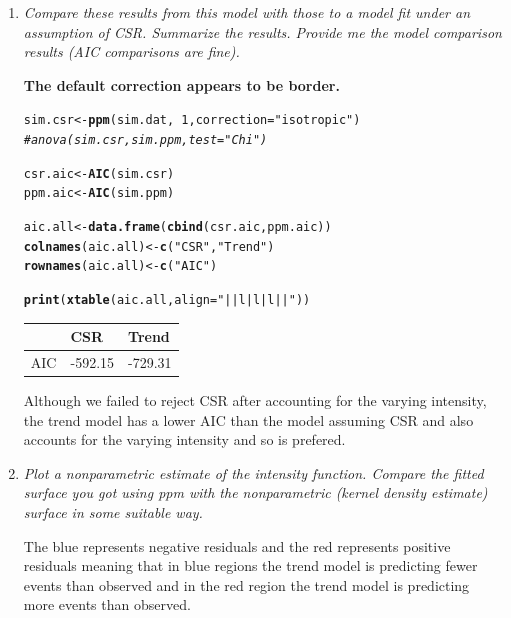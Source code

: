 \documentclass{article}\usepackage[]{graphicx}\usepackage[]{color}
\makeatletter
\newcommand{\hlnum}[1]{\textcolor[rgb]{0.686,0.059,0.569}{#1}}%
\newcommand{\hlstr}[1]{\textcolor[rgb]{0.192,0.494,0.8}{#1}}%
\newcommand{\hlcom}[1]{\textcolor[rgb]{0.678,0.584,0.686}{\textit{#1}}}%
\newcommand{\hlopt}[1]{\textcolor[rgb]{0,0,0}{#1}}%
\newcommand{\hlstd}[1]{\textcolor[rgb]{0.345,0.345,0.345}{#1}}%
\newcommand{\hlkwb}[1]{\textcolor[rgb]{0.69,0.353,0.396}{#1}}%
\newcommand{\hlkwc}[1]{\textcolor[rgb]{0.333,0.667,0.333}{#1}}%
\newcommand{\hlkwd}[1]{\textcolor[rgb]{0.737,0.353,0.396}{\textbf{#1}}}%
\newenvironment{kframe}{%
 \def\at@end@of@kframe{}%
 \ifinner\ifhmode%
  \def\at@end@of@kframe{\end{minipage}}%
  \begin{minipage}{\columnwidth}%
 \fi\fi%
 \def\FrameCommand##1{\hskip\@totalleftmargin \hskip-\fboxsep
 \colorbox{shadecolor}{##1}\hskip-\fboxsep
     \hskip-\linewidth \hskip-\@totalleftmargin \hskip\columnwidth}%
 \MakeFramed {\advance\hsize-\width
   \@totalleftmargin\z@ \linewidth\hsize
   \@setminipage}}%
 {\par\unskip\endMakeFramed%
 \at@end@of@kframe}
\newenvironment{knitrout}{}{} %
\makeatother
\begin{document}
\begin{enumerate}
\begin{enumerate}
\begin{knitrout}
\end{knitrout}

\item %
{\it Compare these results from this model with those to a model fit under an assumption of CSR. Summarize the results. Provide me the model comparison results (AIC comparisons are fine).}

{\bf The default correction appears to be border.}
\begin{kframe}
\begin{alltt}
\hlstd{sim.csr}\hlkwb{<-}\hlkwd{ppm}\hlstd{(sim.dat,}\hlopt{~}\hlnum{1}\hlstd{,}\hlkwc{correction}\hlstd{=}\hlstr{"isotropic"}\hlstd{)}
\hlcom{#anova(sim.csr, sim.ppm,test="Chi")}

\hlstd{csr.aic} \hlkwb{<-} \hlkwd{AIC}\hlstd{(sim.csr)}
\hlstd{ppm.aic} \hlkwb{<-} \hlkwd{AIC}\hlstd{(sim.ppm)}

\hlstd{aic.all} \hlkwb{<-} \hlkwd{data.frame}\hlstd{(}\hlkwd{cbind}\hlstd{(csr.aic,ppm.aic))}
\hlkwd{colnames}\hlstd{(aic.all)} \hlkwb{<-} \hlkwd{c}\hlstd{(}\hlstr{"CSR"}\hlstd{,} \hlstr{"Trend"}\hlstd{)}
\hlkwd{rownames}\hlstd{(aic.all)} \hlkwb{<-} \hlkwd{c}\hlstd{(}\hlstr{"AIC"}\hlstd{)}

\hlkwd{print}\hlstd{(}\hlkwd{xtable}\hlstd{(aic.all,} \hlkwc{align} \hlstd{=} \hlstr{"||l|l|l||"}\hlstd{))}
\end{alltt}
\end{kframe}%
\begin{table}[ht]
\centering
\begin{tabular}{||l|l|l||}
  \hline
 & CSR & Trend \\ 
  \hline
AIC & -592.15 & -729.31 \\ 
   \hline
\end{tabular}
\end{table}


Although we failed to reject CSR after accounting for the varying intensity, the trend model has a lower AIC than the model assuming CSR and also accounts for the varying intensity and so is prefered.

\item %
{\it Plot a nonparametric estimate of the intensity function. Compare the fitted surface you got using ppm with the nonparametric (kernel density estimate) surface in some suitable way.}

The blue represents negative residuals and the red represents positive residuals meaning that in blue regions the trend model is predicting fewer events than observed and in the red region the trend model is predicting more events than observed. 


\end{enumerate}
\end{enumerate}
\end{document}
